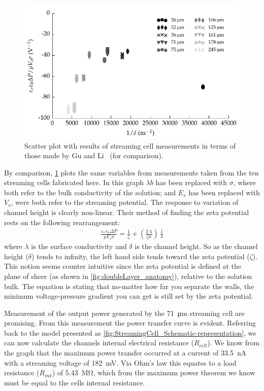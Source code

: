   \begin{figure}
      \centering
      \includegraphics{content/pt1/01-PowerHarvesting/graphics/graph_streamingComparison_gu}
      \caption{\label{fig:streamingCell_scatter_Gu_Li}Scatter plot with results of streaming cell measurements in terms of those made by Gu and Li~\cite{Gu2000} (for comparison).}
  \end{figure}

  By comparison, \cref{fig:streamingCell_scatter_Gu_Li} plots the same variables from measurements taken from the ten streaming cells fabricated here.
  In this graph $\lambda{b}$ has been replaced with $\sigma$, where both refer to the bulk conductivity of the solution; and $E_{s}$ has been replaced with $V_{s}$, were both refer to the streaming potential.
  The response to variation of channel height is clearly non-linear.
  Their method of finding the zeta potential rests on the following rearrangement:
  \begin{eqnarray}
      \frac{\varepsilon_{r}\varepsilon_{0}\Delta P}{\mu V_{s}\sigma} = \frac{1}{\zeta} + \left( \frac{2\,\lambda}{\zeta \sigma}\right)\,\frac{1}{\delta}
  \end{eqnarray}
  where $\lambda$ is the surface conductivity and $\delta$ is the channel height.
  So as the channel height ($\delta$) tends to infinity, the left hand side tends toward the zeta potential ($\zeta$).
  This notion seems counter intuitive since the zeta potential is defined at the plane of sheer (as shown in \cref{fig:doubleLayer_anatomy}), relative to the solution bulk.
  The equation is stating that no-matter how far you separate the walls, the minimum voltage-pressure gradient you can get is still set by the zeta potential.

  Measurement of the output power generated by the \SI{71}{\micro\meter} streaming cell are promising.
  From this measurement the power transfer curve is evident.
  Referring back to the model presented as \cref{fig:StreamingCell_Schematic-representation}, we can now calculate the channels internal electrical resistance ($R_{cell}$).
  We know from the graph that the maximum power transfer occurred at a current of \SI{33.5}{\nano\ampere} with a streaming voltage of \SI{182}{\milli\volt}.
  Via Ohm's law this equates to a load resistance ($R_{out}$) of \SI{5.43}{\mega\ohm}, which from the maximum power theorem we know must be equal to the cells internal resistance.


